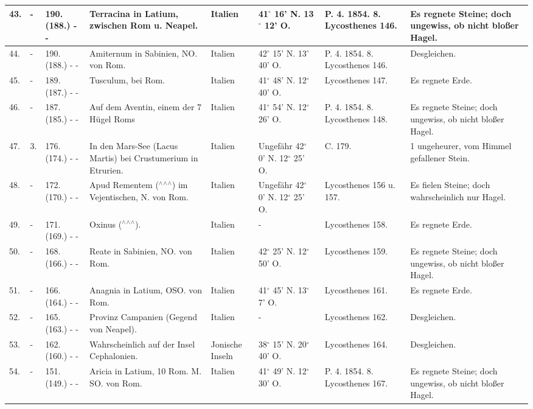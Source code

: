 \documentclass[a4paper, 11pt, oneside, polutonikogreek, german]{article}
\begin{document}
\begin{table}[!ht]
\begin{tabular}{|l|l|l|l|l|l|l|l|}
        43. & - & 190. (188.) - - & Terracina in Latium, zwischen Rom u. Neapel. & Italien & 41$^\circ$ 16' N. 13$^\circ$ 12' O. & P. 4. 1854. 8. Lycosthenes 146. & Es regnete Steine; doch ungewiss, ob nicht bloßer Hagel. \\ \hline
        44. & - & 190. (188.) - - & Amiternum in Sabinien, NO. von Rom. & Italien & 42$^\circ$ 15' N. 13$^\circ$ 40' O. & P. 4. 1854. 8. Lycosthenes 146. & Desgleichen. \\ \hline
        45. & - & 189. (187.) - - & Tusculum, bei Rom. & Italien & 41$^\circ$ 48' N. 12$^\circ$ 40' O. & Lycosthenes 147. & Es regnete Erde. \\ \hline
        46. & - & 187. (185.) - - & Auf dem Aventin, einem der 7 Hügel Roms & Italien & 41$^\circ$ 54' N. 12$^\circ$ 26' O. & P. 4. 1854. 8. Lycosthenes 148. & Es regnete Steine; doch ungewiss, ob nicht bloßer Hagel. \\ \hline
        47. & 3. & 176. (174.) - - & In den Mars-See (Lacus Martis) bei Crustumerium in Etrurien. & Italien & Ungefähr 42$^\circ$ 0' N. 12$^\circ$ 25' O. & C. 179. & 1 ungeheurer, vom Himmel gefallener Stein. \\ \hline
        48. & - & 172. (170.) - - & Apud Rementem ($^\wedge$$^\wedge$$^\wedge$) im Vejentischen, N. von Rom. & Italien & Ungefähr 42$^\circ$ 0' N. 12$^\circ$ 25' O. & Lycosthenes 156 u. 157. & Es fielen Steine; doch wahrscheinlich nur Hagel. \\ \hline
        49. & - & 171. (169.) - - & Oxinus ($^\wedge$$^\wedge$$^\wedge$). & Italien & - & Lycosthenes 158. & Es regnete Erde. \\ \hline
        50. & - & 168. (166.) - - & Reate in Sabinien, NO. von Rom. & Italien & 42$^\circ$ 25' N. 12$^\circ$ 50' O. & Lycosthenes 159. & Es regnete Steine; doch ungewiss, ob nicht bloßer Hagel. \\ \hline
        51. & - & 166. (164.) - - & Anagnia in Latium, OSO. von Rom. & Italien & 41$^\circ$ 45' N. 13$^\circ$ 7' O. & Lycosthenes 161. & Es regnete Erde. \\ \hline
        52. & - & 165. (163.) - - & Provinz Campanien (Gegend von Neapel). & Italien & - & Lycosthenes 162. & Desgleichen. \\ \hline
        53. & - & 162. (160.) - - & Wahrscheinlich auf der Insel Cephalonien. & Jonische Inseln & 38$^\circ$ 15' N. 20$^\circ$ 40' O. & Lycosthenes 164. & Desgleichen. \\ \hline
        54. & - & 151. (149.) - - & Aricia in Latium, 10 Rom. M. SO. von Rom. & Italien & 41$^\circ$ 49' N. 12$^\circ$ 30' O. & P. 4. 1854. 8. Lycosthenes 167. & Es regnete Steine; doch ungewiss, ob nicht bloßer Hagel. \\ \hline

\end{tabular}
\end{table}
\end{document}

